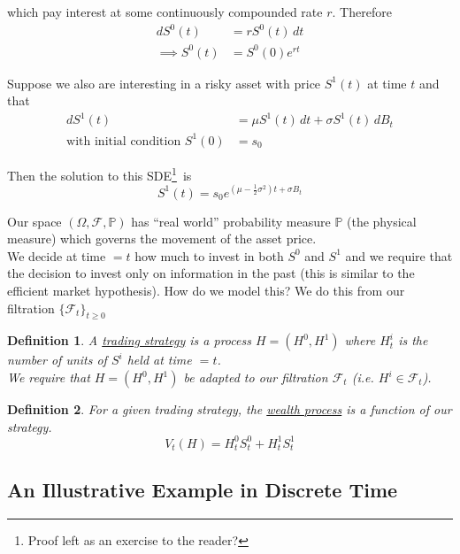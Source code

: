 \documentclass[12pt]{article}
\newtheorem{definition}{Definition}
\newlength\tindent
\renewcommand{\indent}{\hspace*{\tindent}}
\begin{document}
which pay interest at some continuously compounded rate $r$. Therefore
\begin{align*}
	dS^0(t) &= rS^0(t)\,dt \\
	\implies S^0(t) &= S^0(0)e^{rt}  
\end{align*}

Suppose we also are interesting in a risky asset with price $S^1(t)$ at time $t$ and that
\begin{align*}
	dS^1(t) &= \mu S^1(t)\,dt + \sigma S^1(t)\,dB_t \\
	\text{with initial condition } S^1(0)& = s_0
\end{align*}

Then the solution to this SDE\footnote{Proof left as an exercise to the reader?}~is
\begin{equation*}
	S^1(t) = s_0e^{(\mu - \frac{1}{2}\sigma^2)t + \sigma B_t}
\end{equation*}

\indent Our space $(\Omega,\mathcal F,\mathbb P)$ has ``real world'' probability measure $\mathbb P$ (the physical measure) which governs the movement of the asset price. \\

\indent We decide at time $= t$ how much to invest in both $S^0$ and $S^1$ and we require that the decision to invest only on information in the past (this is similar to the efficient market hypothesis). How do we model this? We do this from our filtration $\{\mathcal F_t\}_{t\geq0}$

\begin{definition} A \underline{trading strategy} is a process $H = (H^0,H^1)$ where $H^i_t$ is the number of units of $S^i$ held at time $= t$. \\

We require that $H = (H^0,H^1)$ be adapted to our filtration $\mathcal F_t$ (i.e. $H^i \in \mathcal F_t$).
\end{definition}

\begin{definition} For a given trading strategy, the \underline{wealth process} is a function of our strategy.
\begin{equation*}
	V_t(H) = H^0_tS^0_t + H^1_tS^1_t
\end{equation*} 
\end{definition}

\subsection{An Illustrative Example in Discrete Time}
\end{document}
